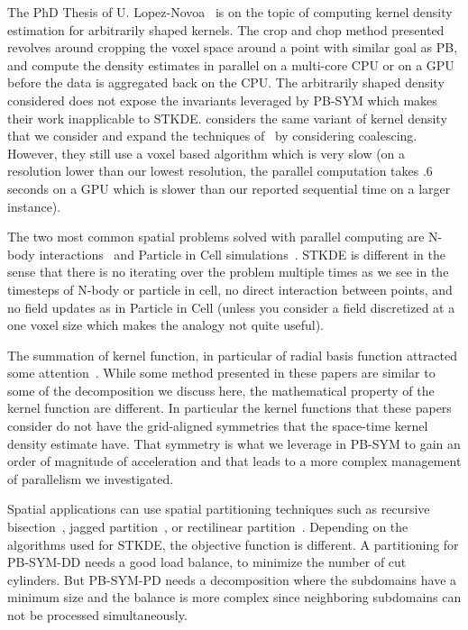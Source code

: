 \documentclass[10pt, conference, compsocconf]{IEEEtran}
\begin{document}
\label{sec:soa}

The PhD Thesis of U. Lopez-Novoa~\cite{LopezNovoa} is on the topic of
computing kernel density estimation for arbitrarily shaped
kernels. The crop and chop method presented revolves around cropping
the voxel space around a point with similar goal as PB, and compute
the density estimates in parallel on a multi-core CPU or on a GPU
before the data is aggregated back on the CPU. The arbitrarily shaped
density considered does not expose the invariants leveraged by PB-SYM
which makes their work inapplicable to STKDE. \cite{Eaglin17} considers
the same variant of kernel density that we consider and expand the
techniques of~\cite{LopezNovoa} by considering coalescing. However,
they still use a voxel based algorithm which is very slow (on a
resolution lower than our lowest resolution, the parallel computation
takes .6 seconds on a GPU which is slower than our reported sequential
time on a larger instance).

The two most common spatial problems solved with parallel computing
are N-body interactions~\cite{Aaseth03} and Particle in Cell
simulations~\cite{karimabadi06}. STKDE is different in the sense that there
is no iterating over the problem multiple times as we see in the
timesteps of N-body or particle in cell, no direct interaction between
points, and no field updates as in Particle in Cell (unless you
consider a field discretized at a one voxel size which makes the
analogy not quite useful).

The summation of kernel function, in particular of radial basis
function attracted some
attention~\cite{MarchXiaoYuBiros2015,FornbergLarssonFlyer2011,YangDuraiswamiGumerovDavis2003}. While
some method presented in these papers are similar to some of the
decomposition we discuss here, the mathematical property of the kernel
function are different. In particular the kernel functions that these
papers consider do not have the grid-aligned symmetries that the
space-time kernel density estimate have. That symmetry is what we
leverage in PB-SYM to gain an order of magnitude of acceleration and
that leads to a more complex management of parallelism we investigated.

Spatial applications can use spatial partitioning techniques 
such as recursive bisection~\cite{berger87}, jagged partition~\cite{ujaldon96,pinar97,DeveciRDC16}, or
rectilinear partition~\cite{nicol94,manne96}. Depending on the algorithms used for
STKDE, the objective function is different. A partitioning for
PB-SYM-DD needs a good load balance, to minimize the number of cut
cylinders. But PB-SYM-PD
needs a decomposition where the subdomains have a minimum size and the balance is more complex since
neighboring subdomains can not be processed simultaneously.
\end{document}
